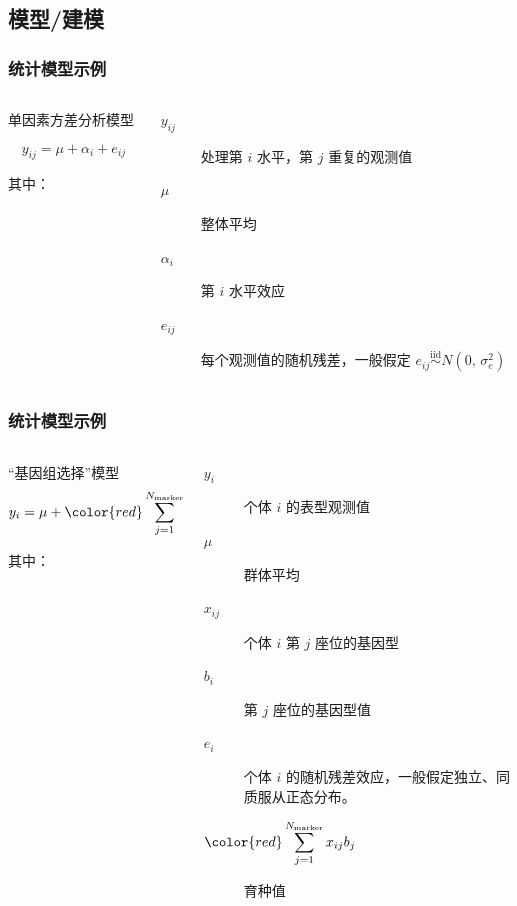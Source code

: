\documentclass[serif,aspectratio=169]{beamer}
\begin{document}
\subsection{模型/建模}
\begin{frame}
  \frametitle{统计模型示例}
  \begin{columns}
    \begin{column}{.4\textwidth}
      \begin{block}{单因素方差分析模型}

        $$y_{ij} = \mu + \alpha_i+e_{ij}$$

        \pause
        其中：
      \end{block}
    \end{column}
    \begin{column}{.6\textwidth}
      \begin{description}
      \item [$y_{ij}$] 处理第 $i$ 水平，第 $j$ 重复的观测值
      \item [$\mu$] 整体平均
      \item [$\alpha_i$] 第 $i$ 水平效应
      \item [$e_{ij}$] 每个观测值的随机残差，一般假定 $e_{ij}\stackrel{\mathrm{iid}}{\sim}N(0,\,\sigma_e^2)$
      \end{description}
    \end{column}
  \end{columns}
\end{frame}


\begin{frame}
  \frametitle{统计模型示例}
  \begin{columns}
    \begin{column}{.4\textwidth}
      \begin{block}{``基因组选择''模型}
        $$
        y_i = \mu+{\color{red}\sum_{j=1}^{N_{\mathrm{marker}}}x_{ij}b_j}+e_i
        $$

        \pause

        其中：
      \end{block}
    \end{column}
    \begin{column}{.6\textwidth}
      \begin{description}
      \item [$y_i$] 个体 $i$ 的表型观测值
      \item [$\mu$] 群体平均
      \item [$x_{ij}$] 个体 $i$ 第 $j$ 座位的基因型
      \item [$b_i$] 第 $j$ 座位的基因型值
      \item [$e_i$] 个体 $i$ 的随机残差效应，一般假定独立、同质服从正态分布。
        \pause
      \item [$\displaystyle{\color{red}\sum_{j=1}^{N_{\mathrm{marker}}}x_{ij}b_j}$] {\color{cyan}育种值}
      \end{description}
    \end{column}
  \end{columns}
\end{frame}
\end{document}
